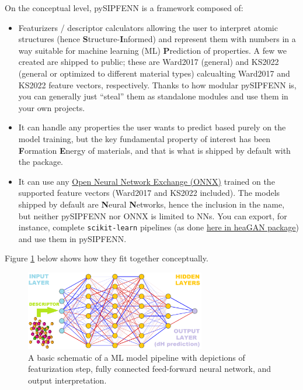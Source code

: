 On the conceptual level, pySIPFENN is a framework composed of:

\begin{itemize}
\item
  Featurizers / descriptor calculators allowing the user to interpret
  atomic structures (hence \textbf{S}tructure-\textbf{I}nformed) and
  represent them with numbers in a way suitable for machine learning
  (ML) \textbf{P}rediction of properties. A few we created are shipped
  to public; these are Ward2017 (general) and KS2022 (general or
  optimized to different material types) calcualting Ward2017 and KS2022
  feature vectors, respectively. Thanks to how modular pySIPFENN is, you
  can generally just ``steal'' them as standalone modules and use them
  in your own projects.
\item
  It can handle any properties the user wants to predict based purely on
  the model training, but the key fundamental property of interest has
  been \textbf{F}ormation \textbf{E}nergy of materials, and that is what
  is shipped by default with the package.
\item
  It can use any \href{https://onnx.ai}{Open Neural Network Exchange
  (ONNX)} trained on the supported feature vectors (Ward2017 and KS2022
  included). The models shipped by default are \textbf{N}eural
  \textbf{N}etworks, hence the inclusion in the name, but neither
  pySIPFENN nor ONNX is limited to NNs. You can export, for instance,
  complete \texttt{scikit-learn} pipelines (as done
  \href{https://github.com/amkrajewski/cGAN_demo/blob/master/heagan/notebooks/train_surrogates.ipynb}{here
  in heaGAN package}) and use them in pySIPFENN.
\end{itemize}

Figure \ref{pysipfenntutorial2:nncolorized} below shows how they fit together conceptually.

\begin{figure}[H]
    \centering
    \includegraphics[width=0.7\textwidth]{pysipfennTutorial2/neuralnetcolorized.png}
    \caption{A basic schematic of a ML model pipeline with depictions of featurization step, fully connected feed-forward neural network, and output interpretation.}
    \label{pysipfenntutorial2:nncolorized}
\end{figure}

